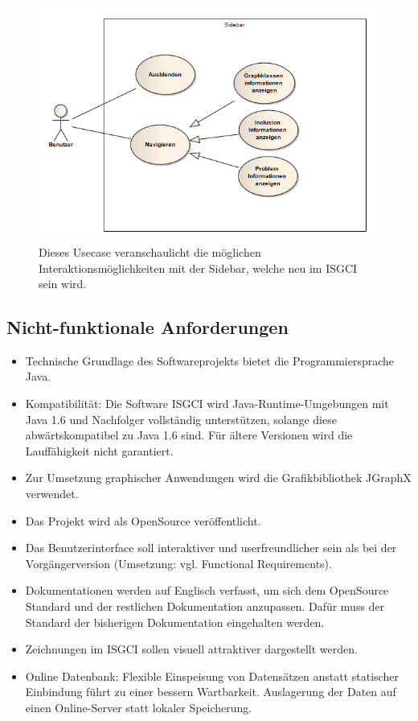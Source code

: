\documentclass[10pt,a4paper]{article}
\begin{document}
\newpage
\begin{figure}[htp]
	\begin{center}
		\includegraphics[width=13cm]{Sidebar.PNG}	
	\end{center}
	\caption{Dieses Usecase veranschaulicht die möglichen Interaktionsmöglichkeiten mit der Sidebar, welche neu im ISGCI sein wird.}
	\label{fig:figure1}
\end{figure}
\newpage

	
	\subsection{Nicht-funktionale Anforderungen} %
		\begin{itemize}
		\item Technische Grundlage des Softwareprojekts bietet die Programmiersprache Java.
		\item Kompatibilität: Die Software ISGCI wird Java-Runtime-Umgebungen mit Java 1.6 und Nachfolger vollständig unterstützen, solange diese abwärtskompatibel zu Java 1.6 sind. Für ältere Versionen wird die Lauffähigkeit nicht garantiert.
		\item Zur Umsetzung graphischer Anwendungen wird die Grafikbibliothek JGraphX verwendet.
		\item Das Projekt wird als OpenSource veröffentlicht.
		\item Das Benutzerinterface soll interaktiver und userfreundlicher sein als bei der Vorgängerversion (Umsetzung: vgl. Functional Requirements).
		\item Dokumentationen werden auf Englisch verfasst, um sich dem OpenSource Standard und der restlichen Dokumentation anzupassen. Dafür muss der Standard der bisherigen Dokumentation eingehalten werden.
		\item Zeichnungen im ISGCI sollen visuell attraktiver dargestellt werden.
		\item Online Datenbank: Flexible Einspeisung von Datensätzen anstatt statischer Einbindung führt zu einer bessern Wartbarkeit. Auslagerung der Daten auf einen Online-Server statt lokaler Speicherung.
		\end{itemize}
		
\end{document}
